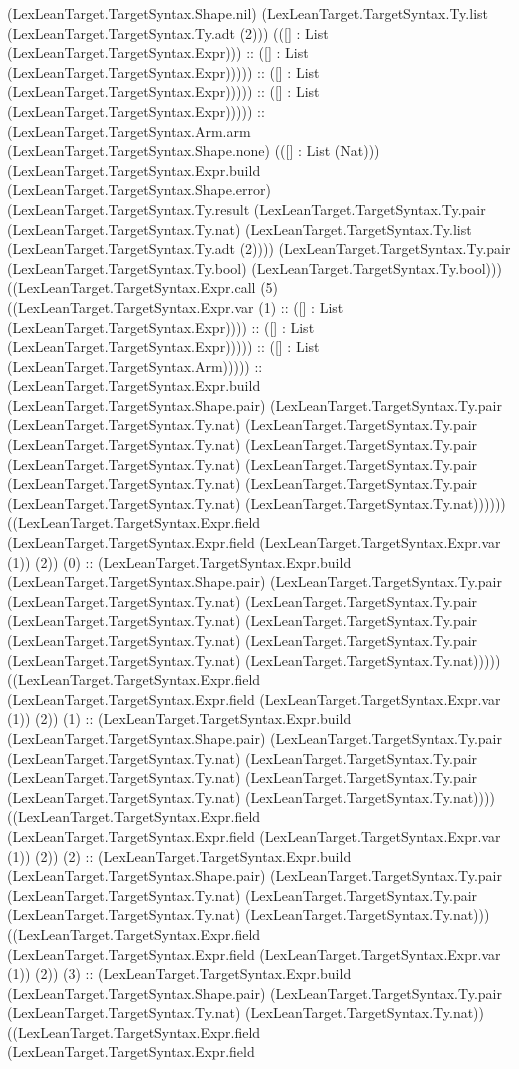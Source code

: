 \documentclass[11pt]{article}
\begin{document}
(LexLeanTarget.TargetSyntax.Shape.nil) (LexLeanTarget.TargetSyntax.Ty.list (LexLeanTarget.TargetSyntax.Ty.adt (2))) (([] : List (LexLeanTarget.TargetSyntax.Expr))) :: ([] : List (LexLeanTarget.TargetSyntax.Expr))))) :: ([] : List (LexLeanTarget.TargetSyntax.Expr))))) :: ([] : List (LexLeanTarget.TargetSyntax.Expr))))) :: (LexLeanTarget.TargetSyntax.Arm.arm (LexLeanTarget.TargetSyntax.Shape.none) (([] : List (Nat))) (LexLeanTarget.TargetSyntax.Expr.build (LexLeanTarget.TargetSyntax.Shape.error) (LexLeanTarget.TargetSyntax.Ty.result (LexLeanTarget.TargetSyntax.Ty.pair (LexLeanTarget.TargetSyntax.Ty.nat) (LexLeanTarget.TargetSyntax.Ty.list (LexLeanTarget.TargetSyntax.Ty.adt (2)))) (LexLeanTarget.TargetSyntax.Ty.pair (LexLeanTarget.TargetSyntax.Ty.bool) (LexLeanTarget.TargetSyntax.Ty.bool))) ((LexLeanTarget.TargetSyntax.Expr.call (5) ((LexLeanTarget.TargetSyntax.Expr.var (1) :: ([] : List (LexLeanTarget.TargetSyntax.Expr)))) :: ([] : List (LexLeanTarget.TargetSyntax.Expr))))) :: ([] : List (LexLeanTarget.TargetSyntax.Arm))))) :: (LexLeanTarget.TargetSyntax.Expr.build (LexLeanTarget.TargetSyntax.Shape.pair) (LexLeanTarget.TargetSyntax.Ty.pair (LexLeanTarget.TargetSyntax.Ty.nat) (LexLeanTarget.TargetSyntax.Ty.pair (LexLeanTarget.TargetSyntax.Ty.nat) (LexLeanTarget.TargetSyntax.Ty.pair (LexLeanTarget.TargetSyntax.Ty.nat) (LexLeanTarget.TargetSyntax.Ty.pair (LexLeanTarget.TargetSyntax.Ty.nat) (LexLeanTarget.TargetSyntax.Ty.pair (LexLeanTarget.TargetSyntax.Ty.nat) (LexLeanTarget.TargetSyntax.Ty.nat)))))) ((LexLeanTarget.TargetSyntax.Expr.field (LexLeanTarget.TargetSyntax.Expr.field (LexLeanTarget.TargetSyntax.Expr.var (1)) (2)) (0) :: (LexLeanTarget.TargetSyntax.Expr.build (LexLeanTarget.TargetSyntax.Shape.pair) (LexLeanTarget.TargetSyntax.Ty.pair (LexLeanTarget.TargetSyntax.Ty.nat) (LexLeanTarget.TargetSyntax.Ty.pair (LexLeanTarget.TargetSyntax.Ty.nat) (LexLeanTarget.TargetSyntax.Ty.pair (LexLeanTarget.TargetSyntax.Ty.nat) (LexLeanTarget.TargetSyntax.Ty.pair (LexLeanTarget.TargetSyntax.Ty.nat) (LexLeanTarget.TargetSyntax.Ty.nat))))) ((LexLeanTarget.TargetSyntax.Expr.field (LexLeanTarget.TargetSyntax.Expr.field (LexLeanTarget.TargetSyntax.Expr.var (1)) (2)) (1) :: (LexLeanTarget.TargetSyntax.Expr.build (LexLeanTarget.TargetSyntax.Shape.pair) (LexLeanTarget.TargetSyntax.Ty.pair (LexLeanTarget.TargetSyntax.Ty.nat) (LexLeanTarget.TargetSyntax.Ty.pair (LexLeanTarget.TargetSyntax.Ty.nat) (LexLeanTarget.TargetSyntax.Ty.pair (LexLeanTarget.TargetSyntax.Ty.nat) (LexLeanTarget.TargetSyntax.Ty.nat)))) ((LexLeanTarget.TargetSyntax.Expr.field (LexLeanTarget.TargetSyntax.Expr.field (LexLeanTarget.TargetSyntax.Expr.var (1)) (2)) (2) :: (LexLeanTarget.TargetSyntax.Expr.build (LexLeanTarget.TargetSyntax.Shape.pair) (LexLeanTarget.TargetSyntax.Ty.pair (LexLeanTarget.TargetSyntax.Ty.nat) (LexLeanTarget.TargetSyntax.Ty.pair (LexLeanTarget.TargetSyntax.Ty.nat) (LexLeanTarget.TargetSyntax.Ty.nat))) ((LexLeanTarget.TargetSyntax.Expr.field (LexLeanTarget.TargetSyntax.Expr.field (LexLeanTarget.TargetSyntax.Expr.var (1)) (2)) (3) :: (LexLeanTarget.TargetSyntax.Expr.build (LexLeanTarget.TargetSyntax.Shape.pair) (LexLeanTarget.TargetSyntax.Ty.pair (LexLeanTarget.TargetSyntax.Ty.nat) (LexLeanTarget.TargetSyntax.Ty.nat)) ((LexLeanTarget.TargetSyntax.Expr.field (LexLeanTarget.TargetSyntax.Expr.field 
\end{document}
